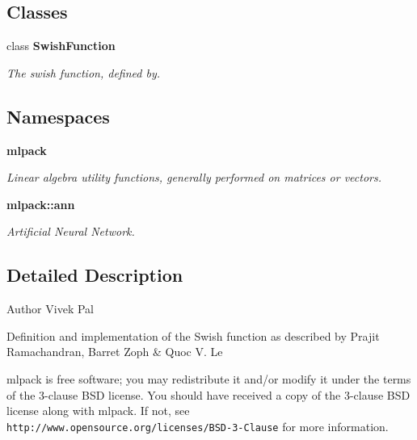 \subsection*{Classes}
\begin{DoxyCompactItemize}
\item 
class \textbf{ Swish\+Function}
\begin{DoxyCompactList}\small\item\em The swish function, defined by. \end{DoxyCompactList}\end{DoxyCompactItemize}
\subsection*{Namespaces}
\begin{DoxyCompactItemize}
\item 
 \textbf{ mlpack}
\begin{DoxyCompactList}\small\item\em Linear algebra utility functions, generally performed on matrices or vectors. \end{DoxyCompactList}\item 
 \textbf{ mlpack\+::ann}
\begin{DoxyCompactList}\small\item\em Artificial Neural Network. \end{DoxyCompactList}\end{DoxyCompactItemize}


\subsection{Detailed Description}
\begin{DoxyAuthor}{Author}
Vivek Pal
\end{DoxyAuthor}
Definition and implementation of the Swish function as described by Prajit Ramachandran, Barret Zoph \& Quoc V. Le

mlpack is free software; you may redistribute it and/or modify it under the terms of the 3-\/clause B\+SD license. You should have received a copy of the 3-\/clause B\+SD license along with mlpack. If not, see {\tt http\+://www.\+opensource.\+org/licenses/\+B\+S\+D-\/3-\/\+Clause} for more information. 